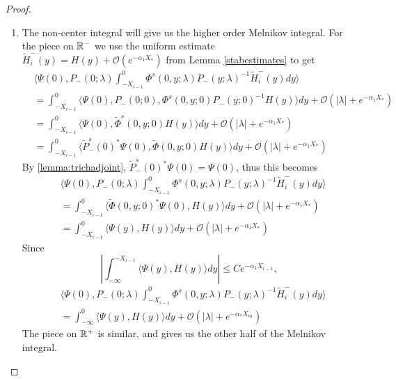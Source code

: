 \documentclass[thesis.tex]{subfiles}
\begin{document}
\begin{lemma}
\begin{proof}
\begin{enumerate}
\item The non-center integral will give us the higher order Melnikov integral. For the piece on $\mathbb{R}^-$ we use the uniform estimate $\tilde{H}_i^-(y) = H(y) + \mathcal{O}(e^{-\alpha_1 X_*})$ from Lemma \ref{stabestimates} to get
\begin{align*}
&\langle \Psi(0), P_-(0; \lambda) \int_{-X_{i-1}}^0 \Phi^s(0, y; \lambda) P_-(y; \lambda)^{-1} \tilde{H}_i^-(y) dy \rangle \\
&= \int_{-X_{i-1}}^0 \langle \Psi(0), P_-(0; 0), \Phi^s(0, y; 0) P_-(y; 0)^{-1} H(y) \rangle dy + \mathcal{O}(|\lambda| + {e^{-\alpha_1 X_*}}) \\
&= \int_{-X_{i-1}}^0 \langle \Psi(0), \tilde{\Phi}^s(0, y; 0) H(y) \rangle dy + \mathcal{O}(|\lambda| + {e^{-\alpha_1 X_*}}) \\
&= \int_{-X_{i-1}}^0 \langle \tilde{P}_-^s(0)^*\Psi(0), \tilde{\Phi}(0, y; 0) H(y) \rangle dy + \mathcal{O}(|\lambda| + {e^{-\alpha_1 X_*}})
\end{align*}
By \ref{lemma:trichadjoint}, $\tilde{P}_-^s(0)^*\Psi(0) = \Psi(0)$, thus this becomes
\begin{align*}
&\langle \Psi(0), P_-(0; \lambda) \int_{-X_{i-1}}^0 \Phi^s(0, y; \lambda) P_-(y; \lambda)^{-1} \tilde{H}_i^-(y) dy \rangle \\
&= \int_{-X_{i-1}}^0 \langle \tilde{\Phi}(0, y; 0) ^* \Psi(0), H(y) \rangle dy + \mathcal{O}(|\lambda| + {e^{-\alpha_1 X_*}}) \\
&= \int_{-X_{i-1}}^0 \langle \Psi(y), H(y) \rangle dy + \mathcal{O}(|\lambda| + {e^{-\alpha_1 X_*}})
\end{align*}
Since 
\[
\left| \int_{-\infty}^{-X_{i-1}} \langle \Psi(y), H(y) \rangle dy \right| \leq Ce^{-\alpha_1 X_{i-1}},
\]
\begin{align*}
&\langle \Psi(0), P_-(0; \lambda) \int_{-X_{i-1}}^0 \Phi^s(0, y; \lambda) P_-(y; \lambda)^{-1} \tilde{H}_i^-(y) dy \rangle \\
&= \int_{-\infty}^0 \langle \Psi(y), H(y) \rangle dy + \mathcal{O}(|\lambda| + {e^{-\alpha_* X_m}})
\end{align*}
The piece on $\mathbb{R}^+$ is similar, and gives us the other half of the Melnikov integral.


\end{enumerate}
\end{proof}
\end{lemma}
\end{document}
